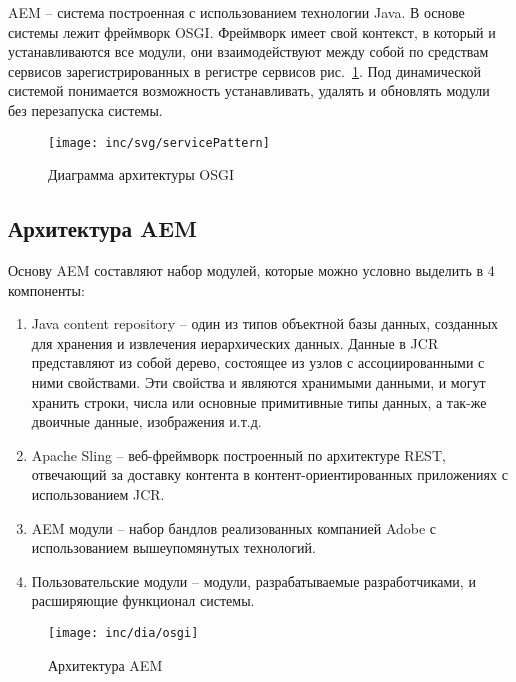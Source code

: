 AEM – система построенная с использованием технологии Java. В основе системы лежит фреймворк OSGI. Фреймворк имеет свой контекст, в который и устанавливаются все модули, они взаимодействуют между собой по средствам сервисов зарегистрированных в регистре сервисов рис.~\ref{fig:servicePattern}. Под динамической системой понимается возможность устанавливать, удалять и обновлять модули без перезапуска системы.

\begin{figure}[h]
  \centering
  \texttt{[image: inc/svg/servicePattern]}
  \caption{Диаграмма архитектуры OSGI}
  \label{fig:servicePattern}
\end{figure}

\subsection{Архитектура AEM}
Основу AEM составляют набор модулей, которые можно условно выделить в 4 компоненты:
\begin{enumerate}
\item Java content repository – один из типов объектной базы данных, созданных для хранения и извлечения иерархических данных. Данные в JCR представляют из собой дерево, состоящее из узлов с ассоциированными с ними свойствами. Эти свойства и являются хранимыми данными, и могут хранить строки, числа или основные примитивные типы данных, а так-же двоичные данные, изображения и.т.д. 
\item Apache Sling – веб-фреймворк построенный по архитектуре REST, отвечающий за доставку контента в контент-ориентированных приложениях с использованием JCR.
\item AEM модули – набор бандлов реализованных компанией Adobe с использованием вышеупомянутых технологий.
\item Пользовательские модули – модули, разрабатываемые разработчиками, и расширяющие функционал системы.
\end{enumerate}

\begin{figure}[h]
  \centering
  \texttt{[image: inc/dia/osgi]}
  \caption{Архитектура AEM}
  \label{fig:fig02}
\end{figure}

